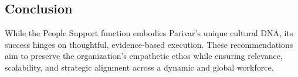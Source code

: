 \documentclass[10pt,a4paper]{book}
\begin{document}
\begin{multicols}{2}
\begin{enumerate}
\end{enumerate}

\subsection*{Conclusion}

While the People Support function embodies Parivar’s unique cultural DNA, its success hinges on thoughtful, evidence-based execution. These recommendations aim to preserve the organization’s empathetic ethos while ensuring relevance, scalability, and strategic alignment across a dynamic and global workforce.

\end{multicols}

\vspace{1cm}
\end{document}
